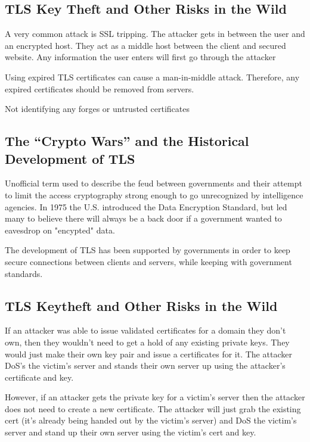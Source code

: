\documentclass[11pt]{article} %
\begin{document}
\subsection{TLS Key Theft and Other Risks in the Wild}
{\parindent0pt A very common attack is SSL tripping. The attacker gets in 
between the user and an encrypted host. They act as a middle host between the 
client and secured website. Any information the user enters will first go 
through the attacker}

\bigskip
{\parindent0pt Using expired TLS certificates can cause a man-in-middle attack.
Therefore, any expired certificates should be removed from servers.}

\bigskip
{\parindent0pt Not identifying any forges or untrusted certificates}

\subsection{The “Crypto Wars” and the Historical Development of TLS}
{\parindent0pt Unofficial term used to describe the feud between governments 
and their attempt to limit the access cryptography strong enough to go 
unrecognized by intelligence agencies. In 1975 the U.S. introduced the Data 
Encryption Standard, but led many to believe there will always be a back door 
if a government wanted to eavesdrop on "encypted" data.}

\bigskip
{\parindent0pt The development of TLS has been supported by governments in 
order to keep secure connections between clients and servers, while keeping 
with government standards.}

\subsection{TLS Keytheft and Other Risks in the Wild}
If an attacker was able to issue validated certificates for a domain they don’t 
own, then they wouldn’t need to get a hold of any existing private keys. They 
would just make their own key pair and issue a certificates for it. The 
attacker DoS’s the victim’s server and stands their own server up using the 
attacker’s certificate and key.

\bigskip
However, if an attacker gets the private key for a victim’s server then the 
attacker does not need to create a new certificate. The attacker will just grab
the existing cert (it’s already being handed out by the victim’s server) and 
DoS the victim’s server and stand up their own server using the victim’s cert 
and key.
\end{document}
